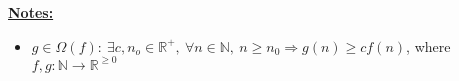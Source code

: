 \documentclass[12pt]{article}
\begin{document}
\begin{enumerate}[1.]
\begin{enumerate}[a)]
\begin{enumerate}[i.]
            \bigskip

        \end{enumerate}

        \bigskip

        \underline{\textbf{Notes:}}

        \bigskip

        \begin{itemize}
            \item
            $g \in \Omega(f):\:\exists c,n_o \in \mathbb{R}^{+},\:\forall n \in
            \mathbb{N},\:n \geq n_0 \Rightarrow g(n) \geq cf(n)$, where $f,g:\mathbb{N} \to \mathbb{R}^{\geq 0}$

        \end{itemize}
    \end{enumerate}
\end{enumerate}
\end{document}
